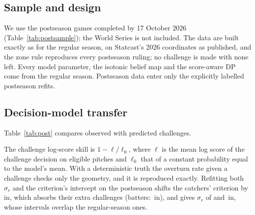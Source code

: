 \documentclass[aoas]{imsart}
\theoremstyle{plain}
\theoremstyle{definition}
\begin{document}
\subsection{Sample and design}
We use the \PostGames{} postseason games completed by 17 October 2026 (Table~\ref{tab:postsample}); the
World Series is not included. The data are built exactly as for the regular season, on Statcast's 2026 coordinates as
published, and the zone rule reproduces every postseason ruling; no challenge is made with none left. Every model
parameter, the isotonic belief map and the score-aware DP come from the regular season. Postseason data enter only
the explicitly labelled postseason refits.

\begin{table}[!htbp]
\caption{The 2026 postseason by round, and the regular season for comparison. Challenges are those on pitches with a
Statcast location (all \NChallenges{} regular-season challenges are located); the catcher column includes pitchers.}\label{tab:postsample}
\centering\small
\resizebox{\textwidth}{!}{}
\end{table}

\subsection{Decision-model transfer}
Table~\ref{tab:post} compares observed with predicted challenges.
\begin{table}[!htbp]
\caption{The 2026 postseason through 17 October, with the regular-season model held fixed unless
stated. Log-score skill: improvement of the challenge log score over a constant challenge probability. Intervals are
95\% intervals from the asymptotic normal law of the refitted parameters; the benchmark's thresholds have slope
\OptSlopeBatter{} (batters) and \OptSlopeCatcher{} (catchers) on $\log g$ in the same regression.}\label{tab:post}
\centering\small
\resizebox{\textwidth}{!}{}
\end{table} The challenge log-score skill is
$1-\ell/\ell_0$, where $\ell$ is the mean log score of the challenge decision on eligible pitches and $\ell_0$ that of
a constant probability equal to the model's mean. With a deterministic truth the overturn rate given a challenge
checks only the geometry, and it is reproduced exactly. Refitting both $\sigma_r$ and the criterion's intercept on
the postseason shifts the catchers' criterion by \PostShiftCatcher{} \PostShiftCatcherCI\,in, which absorbs their extra
challenges (batters: \PostShiftBatter{} \PostShiftBatterCI\,in), and gives $\sigma_r$ of \PostSrShiftBatter{}
\PostSrShiftBatterCI{} and \PostSrShiftCatcher{} \PostSrShiftCatcherCI\,in, whose intervals overlap the
regular-season ones.
\end{document}
